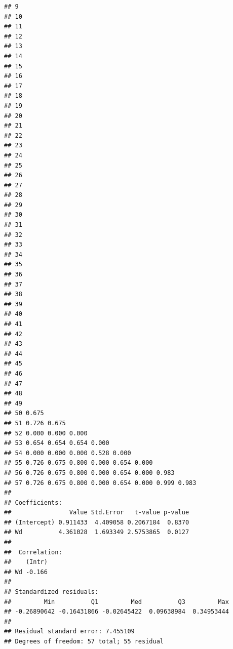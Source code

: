 \documentclass[
]{book}
\begin{document}
\begin{verbatim}
## 9                                                 
## 10                                                
## 11                                                
## 12                                                
## 13                                                
## 14                                                
## 15                                                
## 16                                                
## 17                                                
## 18                                                
## 19                                                
## 20                                                
## 21                                                
## 22                                                
## 23                                                
## 24                                                
## 25                                                
## 26                                                
## 27                                                
## 28                                                
## 29                                                
## 30                                                
## 31                                                
## 32                                                
## 33                                                
## 34                                                
## 35                                                
## 36                                                
## 37                                                
## 38                                                
## 39                                                
## 40                                                
## 41                                                
## 42                                                
## 43                                                
## 44                                                
## 45                                                
## 46                                                
## 47                                                
## 48                                                
## 49                                                
## 50 0.675                                          
## 51 0.726 0.675                                    
## 52 0.000 0.000 0.000                              
## 53 0.654 0.654 0.654 0.000                        
## 54 0.000 0.000 0.000 0.528 0.000                  
## 55 0.726 0.675 0.800 0.000 0.654 0.000            
## 56 0.726 0.675 0.800 0.000 0.654 0.000 0.983      
## 57 0.726 0.675 0.800 0.000 0.654 0.000 0.999 0.983
## 
## Coefficients:
##                Value Std.Error   t-value p-value
## (Intercept) 0.911433  4.409058 0.2067184  0.8370
## Wd          4.361028  1.693349 2.5753865  0.0127
## 
##  Correlation: 
##    (Intr)
## Wd -0.166
## 
## Standardized residuals:
##         Min          Q1         Med          Q3         Max 
## -0.26890642 -0.16431866 -0.02645422  0.09638984  0.34953444 
## 
## Residual standard error: 7.455109 
## Degrees of freedom: 57 total; 55 residual
\end{verbatim}
\end{document}
